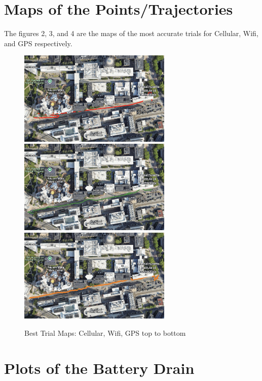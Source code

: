 \documentclass{lab}
\begin{document}
\section{Maps of the Points/Trajectories}

The figures 2, 3, and 4 are the maps of the most accurate trials for Cellular, Wifi, and GPS respectively.

\begin{figure}[!htbp]
\begin{center}
\includegraphics[width=0.65\textwidth]{images/cellular2.png}
\includegraphics[width=0.65\textwidth]{images/wifi2.png}
\includegraphics[width=0.65\textwidth]{images/gps.png}
\caption{Best Trial Maps: Cellular, Wifi, GPS top to bottom}
\end{center}
\end{figure}

\newpage

\section{Plots of the Battery Drain}
\end{document}
